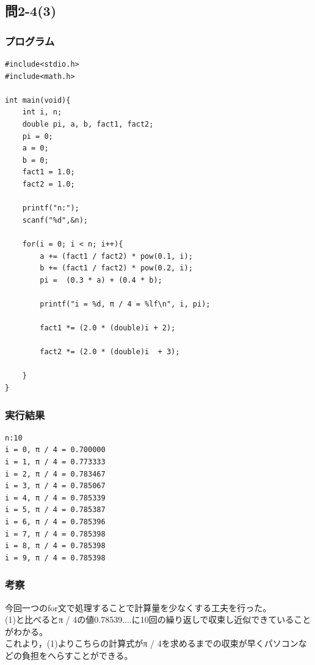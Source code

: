 \documentclass{jarticle}
\begin{document}
\subsection{問2-4(3)\\}
\subsubsection{プログラム\\}
\begin{breakbox}
\begin{verbatim}
#include<stdio.h>
#include<math.h>

int main(void){
    int i, n;
    double pi, a, b, fact1, fact2;
    pi = 0;
    a = 0;
    b = 0;
    fact1 = 1.0;
    fact2 = 1.0;

    printf("n:");
	scanf("%d",&n);

    for(i = 0; i < n; i++){
        a += (fact1 / fact2) * pow(0.1, i);
        b += (fact1 / fact2) * pow(0.2, i);
        pi =  (0.3 * a) + (0.4 * b);

        printf("i = %d, π / 4 = %lf\n", i, pi);

        fact1 *= (2.0 * (double)i + 2); 

        fact2 *= (2.0 * (double)i  + 3);

    }
}
\end{verbatim}
\end{breakbox}

\subsubsection{実行結果\\}
\begin{breakbox}
\begin{verbatim}
n:10
i = 0, π / 4 = 0.700000
i = 1, π / 4 = 0.773333
i = 2, π / 4 = 0.783467
i = 3, π / 4 = 0.785067
i = 4, π / 4 = 0.785339
i = 5, π / 4 = 0.785387
i = 6, π / 4 = 0.785396
i = 7, π / 4 = 0.785398
i = 8, π / 4 = 0.785398
i = 9, π / 4 = 0.785398
\end{verbatim}
\end{breakbox}
\subsubsection{考察\\}
今回一つのfor文で処理することで計算量を少なくする工夫を行った。\\
(1)と比べるとπ / 4の値0.78539....に10回の繰り返しで収束し近似できていることがわかる。\\
これより，(1)よりこちらの計算式がπ / 4を求めるまでの収束が早くパソコンなどの負担をへらすことができる。\\
\end{document}
